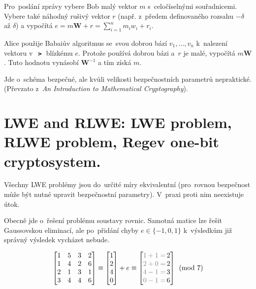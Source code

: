 Pro~poslání zprávy vybere Bob malý vektor $m$ s~celočíselnými souřadnicemi.
Vybere také náhodný rušivý vektor $r$ (např. z~předem definovaného rozsahu $-\delta$ až $\delta$) a vypočítá
$e = m\textbf{W} + r = \sum_{i=1}^n m_i w_i + r_i$.

Alice použije Babaiův algoritmus se~svou dobrou bází $v_1, \dots, v_n$ k~nalezení vektoru v~$\lat$ blízkému $e$.
Protože používá dobrou bázi a~$r$ je malé, vypočítá $m\textbf{W}$.
Tuto hodnotu vynásobí $\textbf{W}^{-1}$ a tím získá $m$.

Jde o~schéma bezpečné, ale kvůli velikosti bezpečnostních parametrů nepraktické.
(Převzato z~\emph{An Introduction to Mathematical Cryptography}\footnotemark{}).


\clearpage
\section{LWE and RLWE: LWE problem, RLWE problem, Regev one-bit cryptosystem.}

Všechny LWE problémy jsou do~určité míry ekvivalentní (pro~rovnou bezpečnost může být nutné upravit bezpečnostní parametry).
V~praxi proti nim neexistuje útok.

Obecně jde o~řešení problému soustavy rovnic.
Samotná matice lze řešit Gaussovskou eliminací, ale po~přidání chyby $e \in \{-1, 0, 1\}$ k~výsledkům již správný výsledek vycházet nebude.

$$
\left[
\begin{matrix}
1 & 5 & 3 & 2 \\
1 & 4 & 2 & 6 \\
2 & 1 & 3 & 1 \\
3 & 4 & 4 & 6 \\
\end{matrix}
\right] \equiv \left[
\begin{matrix}
1 \\ 2 \\ 4 \\ 0
\end{matrix}
\right] + e
\equiv \left[
\begin{matrix}
{\color{gray}1+1=}\, 2 \\
{\color{gray}2+0=}\, 2 \\
{\color{gray}4-1=}\, 3 \\
{\color{gray}0-1=}\, 6 \\
\end{matrix}
\right] \pmod 7
$$


